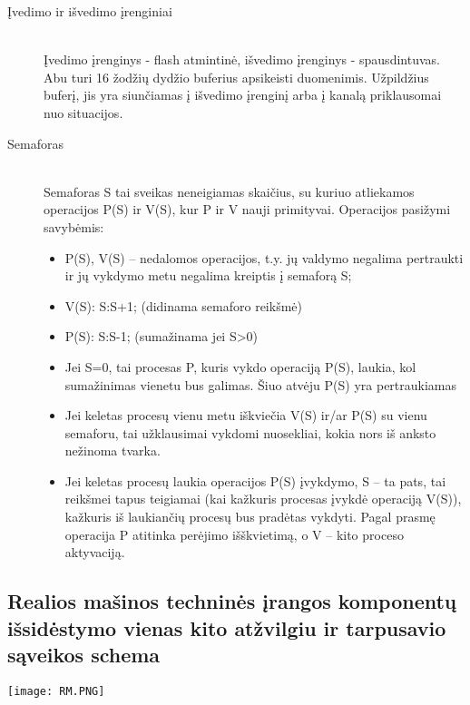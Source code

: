 \begin{description}
  \item[Įvedimo ir išvedimo įrenginiai] \leavevmode \\
Įvedimo įrenginys - flash atmintinė, išvedimo įrenginys - spausdintuvas. Abu turi 16 žodžių dydžio buferius apsikeisti duomenimis. Užpildžius buferį, jis yra siunčiamas
į išvedimo įrenginį arba į kanalą priklausomai nuo situacijos.

  \item[Semaforas] \leavevmode \\
Semaforas S tai sveikas neneigiamas skaičius, su kuriuo atliekamos operacijos P(S) ir V(S), kur P ir V nauji primityvai. Operacijos pasižymi savybėmis:
\begin{itemize}
\item P(S), V(S) – nedalomos operacijos, t.y. jų valdymo negalima pertraukti ir jų vykdymo metu negalima kreiptis į semaforą S;
\item V(S):     S:S+1; (didinama semaforo reikšmė)
\item P(S):      S:S-1; (sumažinama jei S>0)
\item Jei S=0, tai procesas P, kuris vykdo operaciją P(S), laukia, kol sumažinimas vienetu bus galimas. Šiuo atvėju P(S) yra pertraukiamas
\item Jei keletas procesų vienu metu iškviečia V(S) ir/ar P(S) su vienu semaforu, tai užklausimai vykdomi nuosekliai, kokia nors iš anksto nežinoma tvarka.
\item Jei keletas procesų laukia operacijos P(S) įvykdymo, S – ta pats, tai reikšmei tapus teigiamai (kai kažkuris procesas įvykdė operaciją V(S)), kažkuris iš laukiančių procesų bus pradėtas vykdyti.
Pagal prasmę operacija P atitinka perėjimo išškvietimą, o V – kito proceso aktyvaciją.
\end{itemize}


\end{description}

\subsection{Realios mašinos techninės įrangos komponentų išsidėstymo vienas kito atžvilgiu ir tarpusavio sąveikos schema}
\texttt{[image: RM.PNG]}

